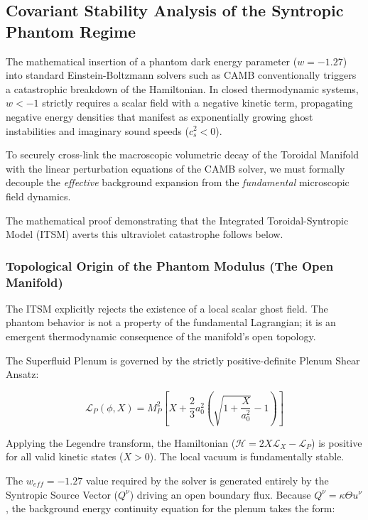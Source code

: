 \documentclass[aps,prd,10pt,twocolumn,superscriptaddress,nofootinbib,floatfix]{revtex4-2}
\begin{document}
\subsection{Covariant Stability Analysis of the Syntropic Phantom Regime}

The mathematical insertion of a phantom dark energy parameter ($w = -1.27$) into standard Einstein-Boltzmann solvers such as CAMB conventionally triggers a catastrophic breakdown of the Hamiltonian. In closed thermodynamic systems, $w < -1$ strictly requires a scalar field with a negative kinetic term, propagating negative energy densities that manifest as exponentially growing ghost instabilities and imaginary sound speeds ($c_s^2 < 0$).

To securely cross-link the macroscopic volumetric decay of the Toroidal Manifold with the linear perturbation equations of the CAMB solver, we must formally decouple the \emph{effective} background expansion from the \emph{fundamental} microscopic field dynamics.

The mathematical proof demonstrating that the Integrated Toroidal-Syntropic Model (ITSM) averts this ultraviolet catastrophe follows below.

\subsubsection{Topological Origin of the Phantom Modulus (The Open Manifold)}

The ITSM explicitly rejects the existence of a local scalar ghost field. The phantom behavior is not a property of the fundamental Lagrangian; it is an emergent thermodynamic consequence of the manifold's open topology.

The Superfluid Plenum is governed by the strictly positive-definite Plenum Shear Ansatz:

\begin{equation}
\mathcal{L}_P(\phi,X) = M_P^2 \left[ X + \frac{2}{3}a_0^2 \left( \sqrt{1+\frac{X}{a_0^2}} - 1 \right) \right]
\end{equation}

Applying the Legendre transform, the Hamiltonian ($\mathcal{H} = 2X\mathcal{L}_X - \mathcal{L}_P$) is positive for all valid kinetic states ($X > 0$). The local vacuum is fundamentally stable.

The $w_{eff} = -1.27$ value required by the solver is generated entirely by the Syntropic Source Vector ($Q^\nu$) driving an open boundary flux. Because $Q^\nu = \kappa \Theta u^\nu$, the background energy continuity equation for the plenum takes the form:
\end{document}
